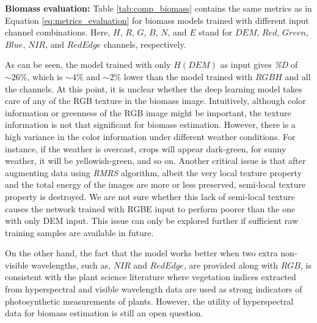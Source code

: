 \documentclass[10pt,twocolumn,letterpaper]{article}
\begin{document}
\textbf{Biomass evaluation: } Table \ref{tab:comp_biomass} contains the same metrics as in Equation \ref{eq:metrics_evaluation} for biomass models trained with different input channel combinations. Here, $H$, $R$, $G$, $B$, $N$, and $E$ stand for $DEM$, $Red$, $Green$, $Blue$, $NIR$, and $Red Edge$ channels, respectively.

As can be seen, the model trained with only $H(DEM)$ as input gives \textit{\%D} of $\sim26\%$, which is $\sim4\%$ and $\sim2\%$ lower than the model trained with $RGBH$ and all the channels. At this point, it is unclear whether the deep learning model takes care of any of the RGB texture in the biomass image. Intuitively, although color information or greenness of the RGB image might be important, the texture information is not that significant for biomass estimation. However, there is a high variance in the color information under different weather conditions. For instance, if the weather is overcast, crops will appear dark-green, for sunny weather, it will be yellowish-green, and so on. Another critical issue is that after augmenting data using \textit{RMRS} algorithm, albeit the very local texture property and the total energy of the images are more or less preserved, semi-local texture property is destroyed. We are not sure whether this lack of semi-local texture causes the network trained with RGBE input to perform poorer than the one with only DEM input. This issue can only be explored further if sufficient raw training samples are available in future.

On the other hand, the fact that the model works better when two extra non-visible wavelengths, such as, $NIR$ and $Red Edge$, are provided along with $RGB$, is consistent with the plant science literature \cite{sellers1985} where vegetation indices extracted from hyperspectral and visible wavelength data are used as strong indicators of photosynthetic measurements of plants. However, the utility of hyperspectral data for biomass estimation is still an open question.
\end{document}
